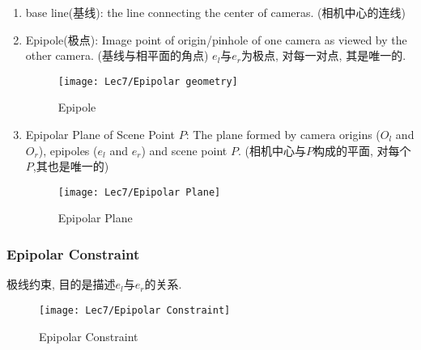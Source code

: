 \begin{enumerate}
    \item base line(基线): the line connecting the center of cameras. (相机中心的连线)
    \item Epipole(极点): Image point of origin/pinhole of one camera as viewed by the other camera. (基线与相平面的角点) $e_l$与$e_r$为极点, 对每一对点, 其是唯一的. 
    \begin{figure}[H]
        \centering
        \texttt{[image: Lec7/Epipolar geometry]}
        \caption{Epipole}
    \end{figure}
    \item Epipolar Plane of Scene Point $P$: The plane formed by camera origins ($O_l$ and $O_r$), epipoles ($e_l$ and $e_r$) and scene point $P$. (相机中心与$P$构成的平面, 对每个$P$,其也是唯一的)
    \begin{figure}[H]
        \centering
        \texttt{[image: Lec7/Epipolar Plane]}
        \caption{Epipolar Plane}
    \end{figure}
\end{enumerate}

\subsubsection{Epipolar Constraint}
极线约束, 目的是描述$e_l$与$e_r$的关系. 
\begin{figure}[H]
    \centering
    \texttt{[image: Lec7/Epipolar Constraint]}
    \caption{Epipolar Constraint}
\end{figure}

